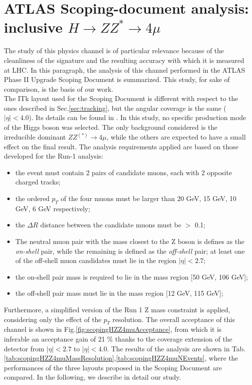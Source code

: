 \documentclass[a4paper,twoside,12pt]{book}
\begin{document}
\section{ATLAS Scoping-document analysis: inclusive $H \rightarrow ZZ^* \rightarrow 4\mu$}\label{subsec:physics:scoping}
The study of this physics channel is of particular relevance because of the cleanliness of the signature and the resulting accuracy with which it is measured at LHC. In this paragraph, the analysis of this channel performed in the ATLAS Phase II Upgrade
Scoping Document\cite{scoping} is summarized. This study, for sake of comparison, is the basis of our work.\\

The ITk layout used for the Scoping Document is different with respect to the ones described in Sec.\ref{sec:tracking}, but the angular coverage is the same ($|\eta| < 4.0$). Its details
can be found in \cite{scoping}. In this study, no specific production mode of the Higgs boson was selected. The only background considered is the irreducible dominant $ZZ^{(*)} \rightarrow 4\mu$, while the others are
expected to have a small effect on the final result. The analysis requirements applied are based on those developed for the Run-1 analysis:

\begin{itemize}
\item the event must contain 2 pairs of candidate muons, each with 2
opposite charged tracks;
\item the ordered $p_T$ of the four muons must be larger than 20 GeV, 15 GeV, 10 GeV, 6 GeV respectively;
\item the $\Delta R$ distance between the candidate muons must be $>$ 0.1;
\item The neutral muon pair with the mass closest to the Z boson is defines as the \textit{on-shell} pair, while the remaining is defined as the \textit{off-shell} pair;
 at least one of the off-shell muon candidates must lie in the
region $|\eta| < 2.7$;	
\item the on-shell pair mass is required to lie in the mass region [50 GeV, 106 GeV];
\item the off-shell pair mass must lie in the mass region [12 GeV, 115 GeV];
\end{itemize}

Furthermore, a simplified version of the Run 1 Z mass constraint is applied, considering only 
the effect of the $p_T$ resolution. The overall acceptance of this channel is shown in Fig.\ref{fig:scopingHZZ4muAcceptance}, from which it is inferable an 
acceptance gain of 21 \% thanks to the coverage extension of the detector from $|\eta| < 2.7$ to 
$|\eta| < 4.0$. The results of the analysis are shown in Tab.\ref{tab:scopingHZZ4muMassResolution},\ref{tab:scopingHZZ4muNEvents}, where the 
performances of the three layouts proposed in the Scoping Document are compared. In the following, we describe in detail our study.\\
\end{document}

